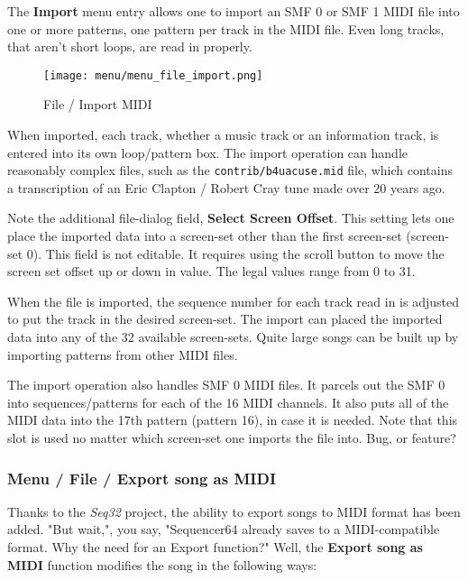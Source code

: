    The \textbf{Import} menu entry allows one to import an SMF 0
   or SMF 1 MIDI file into one or more patterns, one pattern per track in
   the MIDI file.  Even long tracks, that aren't short loops, are read in
   properly.

\begin{figure}[H]
   \centering 
   \texttt{[image: menu/menu\_file\_import.png]}
   \caption{File / Import MIDI}
   \label{fig:seq64_menu_file_import}
\end{figure}

   When imported, each track, whether a music track or an information track,
   is entered into its own loop/pattern box.  The import operation can
   handle reasonably complex files,
   such as the \texttt{contrib/b4uacuse.mid} file, which contains
   a transcription of an Eric Clapton / Robert Cray tune made over 20 years ago.

   Note the additional file-dialog field,
   \textbf{Select Screen Offset}.
   This setting lets one place the imported data into a screen-set other than
   the first screen-set (screen-set 0).
   This field is not editable.  It requires using the scroll button to move the
   screen set offset up or down in value.  The legal values range from 0
   to 31.

   When the file is imported, the sequence number for each track read in is
   adjusted to put the track in the desired screen-set.
   The import can placed the imported data into any of the 32 available
   screen-sets.  Quite large songs can be built up by importing patterns from
   other MIDI files.

   The import operation also handles SMF 0 MIDI files.  It parcels out the SMF
   0 into sequences/patterns for each of the 16 MIDI channels.  It also puts
   all of the MIDI data into the 17th pattern (pattern 16), in case it is
   needed.  Note that this slot is used no matter which screen-set one imports
   the file into.  Bug, or feature?

\subsubsection{Menu / File / Export song as MIDI}
\label{subsubsec:seq64_menu_file_export}

   Thanks to the \textsl{Seq32} project, the ability to export songs to MIDI
   format has been added.
   "But wait,", you say, "Sequencer64 already saves to a MIDI-compatible
   format.  Why the need for an Export function?"
   Well, the \textbf{Export song as MIDI} function modifies the song in the
   following ways:

